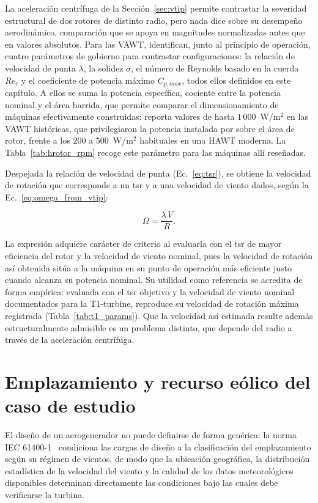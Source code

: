 La aceleración centrífuga de la Sección~\ref{sec:vtip} permite contrastar la severidad estructural de dos rotores de distinto radio, pero nada dice sobre su desempeño aerodinámico, comparación que se apoya en magnitudes normalizadas antes que en valores absolutos. Para las VAWT, \textcite{Essahraoui2026} identifican, junto al principio de operación, cuatro parámetros de gobierno para contrastar configuraciones: la relación de velocidad de punta $\lambda$, la solidez $\sigma$, el número de Reynolds basado en la cuerda $Re_c$ y el coeficiente de potencia máximo $C_{p,max}$, todos ellos definidos en este capítulo. A ellos se suma la potencia específica, cociente entre la potencia nominal y el área barrida, que permite comparar el dimensionamiento de máquinas efectivamente construidas: \textcite{Mollerstrom2019} reporta valores de hasta $1\,000$~W/m$^2$ en las VAWT históricas, que privilegiaron la potencia instalada por sobre el área de rotor, frente a los $200$ a $500$~W/m$^2$ habituales en una HAWT moderna. La Tabla~\ref{tab:hrotor_rpm} recoge este parámetro para las máquinas allí reseñadas.

Despejada la relación de velocidad de punta (Ec.~\ref{eq:tsr}), se obtiene la velocidad de rotación que corresponde a un \gls{tsr} y a una velocidad de viento dados, según la Ec.~\ref{eq:omega_from_vtip}:

\begin{equation}
    \Omega = \frac{\lambda \, V}{R}.
    \label{eq:omega_from_vtip}
\end{equation}

La expresión adquiere carácter de criterio al evaluarla con el \gls{tsr} de mayor eficiencia del rotor y la velocidad de viento nominal, pues la velocidad de rotación así obtenida sitúa a la máquina en su punto de operación más eficiente justo cuando alcanza su potencia nominal. Su utilidad como referencia se acredita de forma empírica: evaluada con el \gls{tsr} objetivo y la velocidad de viento nominal documentados para la T1-turbine, reproduce su velocidad de rotación máxima registrada (Tabla~\ref{tab:t1_params}). Que la velocidad así estimada resulte además estructuralmente admisible es un problema distinto, que depende del radio a través de la aceleración centrífuga.

\section{Emplazamiento y recurso eólico del caso de estudio}

El diseño de un aerogenerador no puede definirse de forma genérica: la norma IEC 61400-1~\parencite*{IEC61400-1} condiciona las cargas de diseño a la clasificación del emplazamiento según su régimen de vientos, de modo que la ubicación geográfica, la distribución estadística de la velocidad del viento y la calidad de los datos meteorológicos disponibles determinan directamente las condiciones bajo las cuales debe verificarse la turbina.

